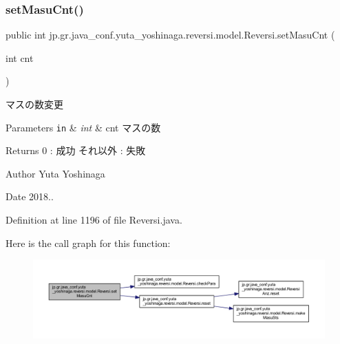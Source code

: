 \subsubsection{\texorpdfstring{set\+Masu\+Cnt()}{setMasuCnt()}}
{\footnotesize\ttfamily public int jp.\+gr.\+java\+\_\+conf.\+yuta\+\_\+yoshinaga.\+reversi.\+model.\+Reversi.\+set\+Masu\+Cnt (\begin{DoxyParamCaption}\item[{int}]{cnt }\end{DoxyParamCaption})}



マスの数変更 


\begin{DoxyParams}[1]{Parameters}
\mbox{\tt in}  & {\em int} & cnt マスの数 \\
\hline
\end{DoxyParams}
\begin{DoxyReturn}{Returns}
0 \+: 成功 それ以外 \+: 失敗 
\end{DoxyReturn}
\begin{DoxyAuthor}{Author}
Yuta Yoshinaga 
\end{DoxyAuthor}
\begin{DoxyDate}{Date}
2018.. 
\end{DoxyDate}


Definition at line 1196 of file Reversi.\+java.

Here is the call graph for this function\+:
\nopagebreak
\begin{figure}[H]
\begin{center}
\leavevmode
\includegraphics[width=350pt]{classjp_1_1gr_1_1java__conf_1_1yuta__yoshinaga_1_1reversi_1_1model_1_1_reversi_a0e9bc15d570635cf024287fbf541b4b9_cgraph}
\end{center}
\end{figure}
\mbox{\label{classjp_1_1gr_1_1java__conf_1_1yuta__yoshinaga_1_1reversi_1_1model_1_1_reversi_a7abf9238b933653eec2908f6e1a863db}} 
